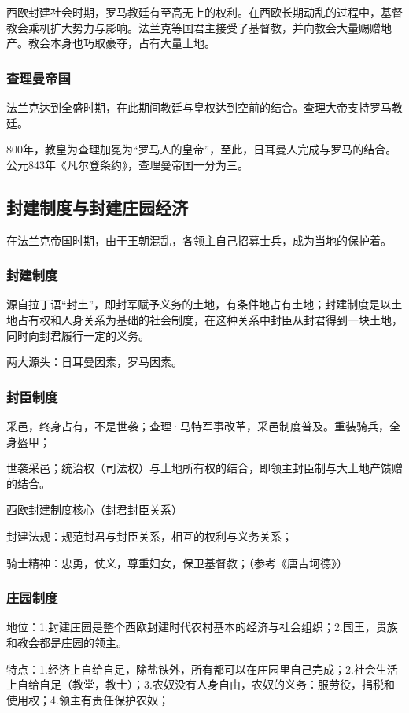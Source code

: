 西欧封建社会时期，罗马教廷有至高无上的权利。在西欧长期动乱的过程中，基督教会乘机扩大势力与影响。法兰克等国君主接受了基督教，并向教会大量赐赠地产。教会本身也巧取豪夺，占有大量土地。

\subsubsection{查理曼帝国}
法兰克达到全盛时期，在此期间教廷与皇权达到空前的结合。查理大帝支持罗马教廷。

800年，教皇为查理加冕为“罗马人的皇帝”，至此，日耳曼人完成与罗马的结合。公元843年《凡尔登条约》，查理曼帝国一分为三。


\subsection{封建制度与封建庄园经济}
在法兰克帝国时期，由于王朝混乱，各领主自己招募士兵，成为当地的保护着。

\subsubsection{封建制度}
源自拉丁语“封土”，即封军赋予义务的土地，有条件地占有土地；封建制度是以土地占有权和人身关系为基础的社会制度，在这种关系中封臣从封君得到一块土地，同时向封君履行一定的义务。

两大源头：日耳曼因素，罗马因素。

\subsubsection{封臣制度}
采邑，终身占有，不是世袭；查理·马特军事改革，采邑制度普及。重装骑兵，全身盔甲；

世袭采邑；统治权（司法权）与土地所有权的结合，即领主封臣制与大土地产馈赠的结合。

西欧封建制度核心（封君封臣关系）

封建法规：规范封君与封臣关系，相互的权利与义务关系；

骑士精神：忠勇，仗义，尊重妇女，保卫基督教；（参考《唐吉坷德》）

\subsubsection{庄园制度}
地位：1.封建庄园是整个西欧封建时代农村基本的经济与社会组织；2.国王，贵族和教会都是庄园的领主。

特点：1.经济上自给自足，除盐铁外，所有都可以在庄园里自己完成；2.社会生活上自给自足（教堂，教士）；3.农奴没有人身自由，农奴的义务：服劳役，捐税和使用权；4.领主有责任保护农奴；


